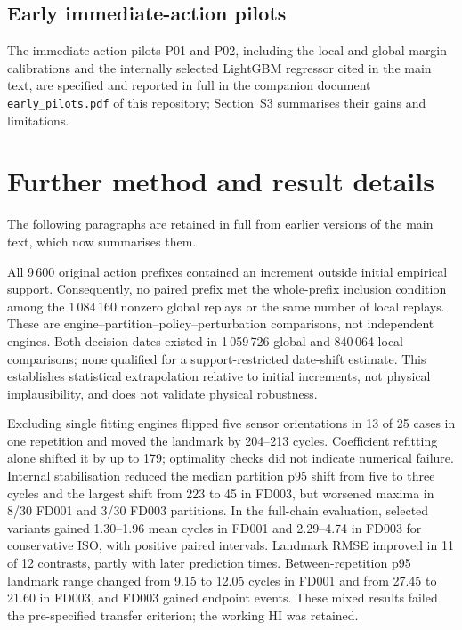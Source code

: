 \documentclass[12pt]{article}
\begin{document}
\subsection*{Early immediate-action pilots}
The immediate-action pilots P01 and P02, including the local and global margin calibrations and the internally selected LightGBM regressor \cite{Ke2017} cited in the main text, are specified and reported in full in the companion document \texttt{early\_pilots.pdf} of this repository; Section~S3 summarises their gains and limitations.

\section{Further method and result details}
The following paragraphs are retained in full from earlier versions of the main text, which now summarises them.

All 9\,600 original action prefixes contained an increment outside initial empirical support. Consequently, no paired prefix met the whole-prefix inclusion condition among the 1\,084\,160 nonzero global replays or the same number of local replays. These are engine--partition--policy--perturbation comparisons, not independent engines. Both decision dates existed in 1\,059\,726 global and 840\,064 local comparisons; none qualified for a support-restricted date-shift estimate. This establishes statistical extrapolation relative to initial increments, not physical implausibility, and does not validate physical robustness.

Excluding single fitting engines flipped five sensor orientations in 13 of 25 cases in one repetition and moved the landmark by 204--213 cycles. Coefficient refitting alone shifted it by up to 179; optimality checks did not indicate numerical failure. Internal stabilisation reduced the median partition p95 shift from five to three cycles and the largest shift from 223 to 45 in FD003, but worsened maxima in 8/30 FD001 and 3/30 FD003 partitions. In the full-chain evaluation, selected variants gained 1.30--1.96 mean cycles in FD001 and 2.29--4.74 in FD003 for conservative ISO, with positive paired intervals. Landmark RMSE improved in 11 of 12 contrasts, partly with later prediction times. Between-repetition p95 landmark range changed from 9.15 to 12.05 cycles in FD001 and from 27.45 to 21.60 in FD003, and FD003 gained endpoint events. These mixed results failed the pre-specified transfer criterion; the working HI was retained.
\end{document}
